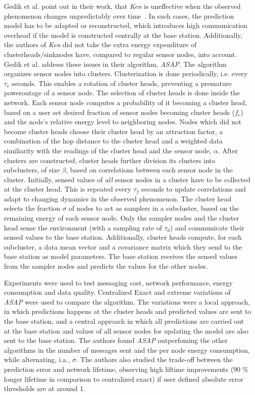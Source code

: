 \par
Gedik et al. point out in their work, that \textit{Ken} is uneffective when the
observed phenomenon changes unpredictably over time~\cite{gedik2007asap}. In
such cases, the prediction model has to be adapted or reconstructed, which
introduces high communication overhead if the model is constructed centrally at
the base station. Additionally, the authors of \textit{Ken} did not take the
extra energy expenditure of clusterheads/sinknodes have, compared to regular
sensor nodes, into account. Gedik et al. address these issues in their
algorithm, \textit{ASAP}. The algorithm organizes sensor nodes into clusters.
Clusterization is done periodically, i.e. every $ \tau_c $ seconds. This
enables a rotation of cluster heads, preventing a premature poweroutage of a
sensor node. The selection of cluster heads is done inside the network. Each
sensor node computes a probability of it becoming a cluster head, based on a
user set desired fraction of sensor nodes becoming cluster heads ($ f_c $) and
the node's relative energy level to neighboring nodes. Nodes which did not
become cluster heads choose their cluster head by an attraction factor, a
combination of the hop distance to the cluster head and a weighted data
similiarity with the readings of the cluster head and the sensor node, $ \alpha
$. After clusters are constructed, cluster heads further division its clusters
into subclusters, of size $ \beta $, based on correlations between each sensor
node in the cluster. Initially, sensed values of \textit{all} sensor nodes in a
cluster have to be collected at the cluster head. This is repeated every $
\tau_f $ seconds to update correlations and adapt to changing dynamics in the
observed phenomenon. The cluster head selects the fraction $ \sigma $ of nodes
to act as samplers in a subcluster, based on the remaining energy of each
sensor node. Only the sampler nodes and the cluster head sense the environment
(with a sampling rate of $ \tau_d $) and communicate their sensed values to the
base station. Additionally, cluster heads compute, for each subcluster, a data
mean vector and a covariance matrix which they send to the base station as model
parameters. The base station receives the sensed values from the sampler nodes
and predicts the values for the other nodes.

Experiments were used to test messaging cost, network performance, energy
consumption and data quality. Centralized Exact and extreme variations of
\textit{ASAP} were used to compare the algorithm. The variations were a local
approach, in which predictions happens at the cluster heads and predicted
values are sent to the base station, and a central approach in which all
predictions are carried out at the base station and values of all sensor nodes
for updating the model are also sent to the base station. The authors found
\textit{ASAP} outperfoming the other algorithms in the number of messages sent
and the per node energy consumption, while alternating, i.a., $ \sigma $. The
authors also studied the trade-off between the prediction error and network
lifetime, observing high liftime improvements (90 \% longer lifetime in
comparison to centralized exact) if user defined absolute error thresholds are
at around 1.

